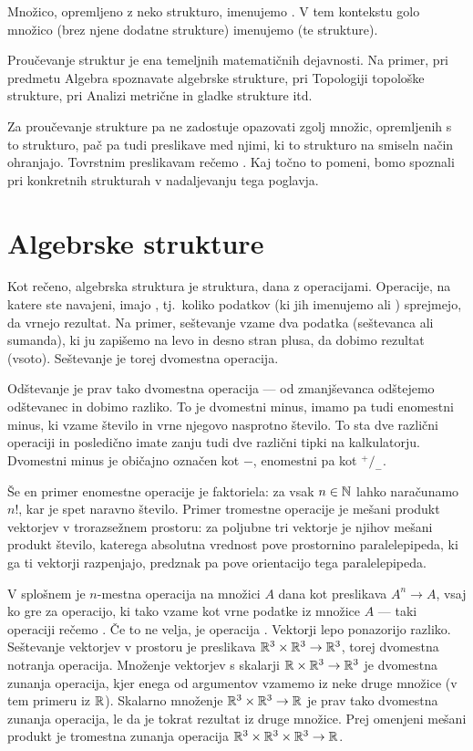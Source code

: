 Množico, opremljeno z neko strukturo, imenujemo . V tem kontekstu golo množico (brez njene dodatne strukture) imenujemo  (te strukture).

Proučevanje struktur je ena temeljnih matematičnih dejavnosti. Na primer, pri predmetu Algebra spoznavate algebrske strukture, pri Topologiji topološke strukture, pri Analizi metrične in gladke strukture itd.

Za proučevanje strukture pa ne zadostuje opazovati zgolj množic, opremljenih s to strukturo, pač pa tudi preslikave med njimi, ki to strukturo na smiseln način ohranjajo. Tovrstnim preslikavam rečemo . Kaj točno to pomeni, bomo spoznali pri konkretnih strukturah v nadaljevanju tega poglavja.



\section{Algebrske strukture}

Kot rečeno, algebrska struktura je struktura, dana z operacijami. Operacije, na katere ste navajeni, imajo , tj.~koliko podatkov (ki jih imenujemo  ali ) sprejmejo, da vrnejo rezultat. Na primer, seštevanje vzame dva podatka (seštevanca ali sumanda), ki ju zapišemo na levo in desno stran plusa, da dobimo rezultat (vsoto). Seštevanje je torej dvomestna operacija.

Odštevanje je prav tako dvomestna operacija --- od zmanjševanca odštejemo odštevanec in dobimo razliko. To je dvomestni minus, imamo pa tudi enomestni minus, ki vzame število in vrne njegovo nasprotno število. To sta dve različni operaciji in posledično imate zanju tudi dve različni tipki na kalkulatorju. Dvomestni minus je običajno označen kot $-$, enomestni pa kot ${}^+/_-$\;.

Še en primer enomestne operacije je faktoriela: za vsak $n \in \mathbb{N}$ lahko naračunamo $n!$, kar je spet naravno število. Primer tromestne operacije je mešani produkt vektorjev v trorazsežnem prostoru: za poljubne tri vektorje je njihov mešani produkt število, katerega absolutna vrednost pove prostornino paralelepipeda, ki ga ti vektorji razpenjajo, predznak pa pove orientacijo tega paralelepipeda.

V splošnem je $n$-mestna operacija na množici $A$ dana kot preslikava $A^n \to A$, vsaj ko gre za operacijo, ki tako vzame kot vrne podatke iz množice $A$ --- taki operaciji rečemo . Če to ne velja, je operacija . Vektorji lepo ponazorijo razliko. Seštevanje vektorjev v prostoru je preslikava $\mathbb{R}^3 \times \mathbb{R}^3 \to \mathbb{R}^3$, torej dvomestna notranja operacija. Množenje vektorjev s skalarji $\mathbb{R} \times \mathbb{R}^3 \to \mathbb{R}^3$ je dvomestna zunanja operacija, kjer enega od argumentov vzamemo iz neke druge množice (v tem primeru iz $\mathbb{R}$). Skalarno množenje $\mathbb{R}^3 \times \mathbb{R}^3 \to \mathbb{R}$ je prav tako dvomestna zunanja operacija, le da je tokrat rezultat iz druge množice. Prej omenjeni mešani produkt je tromestna zunanja operacija $\mathbb{R}^3 \times \mathbb{R}^3 \times \mathbb{R}^3 \to \mathbb{R}$.

